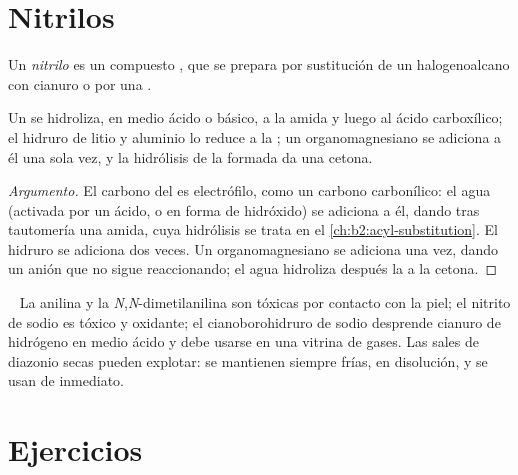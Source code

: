 \section{Nitrilos}

\begin{definition}[Nitrilo]\label{def:b2:amines:nitrile}
Un \emph{nitrilo} es un compuesto , que se prepara por sustitución de un halogenoalcano
con cianuro o por una .
\end{definition}

\begin{proposition}\label{prop:b2:amines:nitrile}
Un  se hidroliza, en medio ácido o básico, a la amida y luego al ácido carboxílico; el
hidruro de litio y aluminio lo reduce a la  ; un organomagnesiano
se adiciona a él una sola vez, y la hidrólisis de la  formada da una cetona.
\end{proposition}

\begin{proof}[Argumento]
El carbono del  es electrófilo, como un carbono carbonílico: el agua (activada por un ácido, o en forma de
hidróxido) se adiciona a él, dando tras tautomería una amida, cuya hidrólisis se trata en el
\cref{ch:b2:acyl-substitution}. El hidruro se adiciona dos veces. Un organomagnesiano se adiciona una vez,
dando un anión  que no sigue reaccionando; el agua hidroliza después la  a la cetona.
\end{proof}

\begin{safety}{\,\,\,}
La anilina y la \textit{N},\textit{N}-dimetilanilina son tóxicas por contacto con la piel; el nitrito de sodio es
tóxico y oxidante; el cianoborohidruro de sodio desprende cianuro de hidrógeno en medio ácido y debe usarse
en una vitrina de gases. Las sales de diazonio secas pueden explotar: se mantienen siempre frías, en disolución, y se usan
de inmediato.
\end{safety}

\section{Ejercicios}

